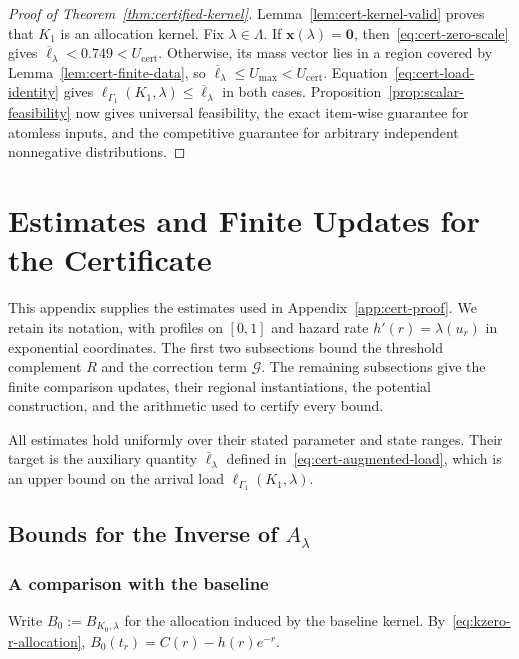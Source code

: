 \documentclass[11pt]{article}
\theoremstyle{definition}
\theoremstyle{remark}
\begin{document}
\begin{proof}[Proof of Theorem~\ref{thm:certified-kernel}]
Lemma~\ref{lem:cert-kernel-valid} proves that $K_1$ is an allocation
kernel.  Fix $\lambda\in\Lambda$.
If $\mathbf x(\lambda)=\mathbf0$, then~\eqref{eq:cert-zero-scale}
gives $\overline\ell_\lambda<0.749<U_{\mathrm{cert}}$.
Otherwise, its mass vector lies in a region covered by
Lemma~\ref{lem:cert-finite-data}, so
$\overline\ell_\lambda\le U_{\max}<U_{\mathrm{cert}}$.
Equation~\eqref{eq:cert-load-identity} gives
$\ell_{\Gamma_1}(K_1,\lambda)\le\overline\ell_\lambda$ in both cases.
Proposition~\ref{prop:scalar-feasibility} now gives universal
feasibility, the exact item-wise guarantee for atomless inputs,
and the competitive guarantee for arbitrary independent
nonnegative distributions.
\end{proof}

\section{Estimates and Finite Updates for the Certificate}
\label{app:cert-details}

This appendix supplies the estimates used in Appendix~\ref{app:cert-proof}.
We retain its notation, with profiles on $[0,1]$ and hazard rate
$h'(r)=\lambda(u_r)$ in exponential coordinates.
The first two subsections bound the threshold complement $R$ and the
correction term $\mathcal G$.
The remaining subsections give the finite comparison updates, their
regional instantiations, the potential construction, and the arithmetic
used to certify every bound.

All estimates hold uniformly over their stated parameter and state
ranges.  Their target is the auxiliary quantity $\overline\ell_\lambda$
defined in~\eqref{eq:cert-augmented-load}, which is an upper bound on
the arrival load $\ell_{\Gamma_1}(K_1,\lambda)$.

\subsection{Bounds for the Inverse of \texorpdfstring{$A_\lambda$}{A lambda}}
\label{app:cert-inverse-bounds}

\subsubsection{A comparison with the baseline}
Write $B_0:=B_{K_0,\lambda}$ for the allocation induced by the
baseline kernel.  By~\eqref{eq:kzero-r-allocation},
$B_0(t_r)=C(r)-h(r)e^{-r}$.
\end{document}
